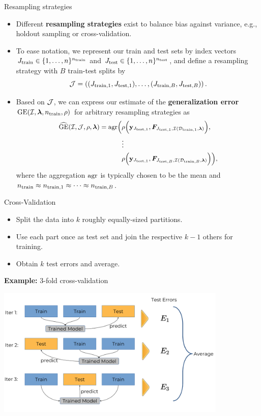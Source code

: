 \begin{vbframe}{Resampling strategies}
\footnotesize
\begin{itemize}
  \item Different \textbf{resampling strategies} exist to balance bias against 
  variance, e.g., holdout sampling or cross-validation.
  \item To ease notation, we represent our train and test sets by index
  vectors $\Jtrain \in \nset^{\ntrain}$ and $\Jtest
  \in \nset^{\ntest}$, and define a resampling strategy with 
  $B$ train-test splits by $$\JJ = \JJset.$$
  \item Based on $\JJ$, we can express our estimate of the \textbf{generalization error} 
 $\GEfull$ for arbitrary resampling strategies as
\begin{equation*}
\small
\begin{split}
\GEhresa = \agr\Big(
 &\rho\Big(\yv_{\Jtesti[1]}, \FJtestftraini[1]\Big), \\ &\large{\vdots} \\
& \rho\Big(\yv_{\Jtesti[1]}, \FJtestftraini[B]\Big)
    \Big),
\end{split}
\end{equation*}
  where the aggregation \textcolor{blue}{$\agr$} is typically chosen to 
  be the mean and $\ntrain \approx \ntraini[1] \approx \dots \approx \ntraini[B]$.
\end{itemize}

\end{vbframe}


\begin{vbframe}{Cross-Validation}

\begin{itemize}
  \item Split the data into $k$ roughly equally-sized partitions.
  \item Use each part once as test set and join the respective $k-1$ others for 
  training.
  \item Obtain $k$ test errors and average.
\end{itemize}

\lz

\textbf{Example:} 3-fold cross-validation

\begin{center}
\includegraphics[width=11cm]{figure_man/crossvalidation.png}
\end{center}
\end{vbframe}

